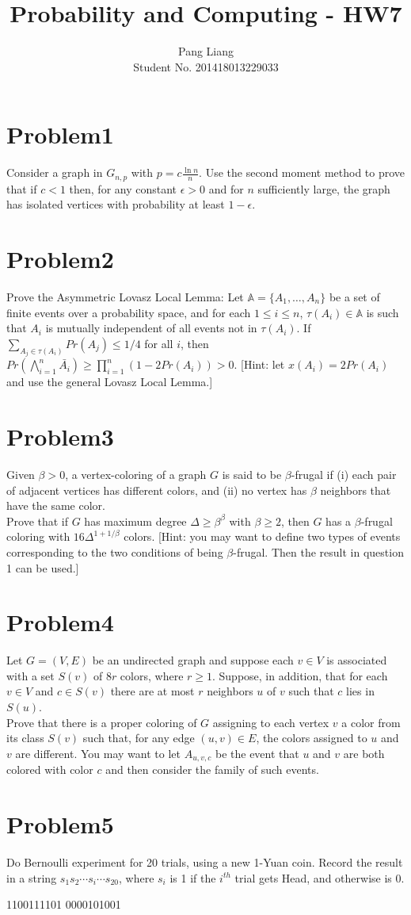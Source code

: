 \documentclass[12pt]{article}
\title{Probability and Computing - HW7}
\author{Pang Liang\\ Student No. 201418013229033}
\begin{document}
\maketitle

\section{Problem1}
Consider a graph in $G_{n,p}$ with $p = c\frac{\ln{n}}{n}$. Use the second moment method to prove that if $c < 1$ then, for any constant $\epsilon > 0$ and for $n$ sufficiently large, the graph has isolated vertices with probability at least $1-\epsilon$.

\section{Problem2}
Prove the Asymmetric Lovasz Local Lemma: Let $\mathbb{A} = \{A_1, \dots, A_n\}$ be a set of finite events over a probability space, and for each $1 \le i \le n$, $\tau(A_i) \in \mathbb{A}$ is such that $A_i$ is mutually independent of all events not in $\tau(A_i)$. If $\sum_{A_j \in \tau(A_i)} Pr(A_j) \le 1/4 $ for all $i$, then $ Pr(\bigwedge_{i=1}^n \bar{A_i}) \ge \prod_{i=1}^n (1 - 2Pr(A_i))> 0$. [Hint: let $x(A_i) = 2Pr(A_i)$ and use the general Lovasz Local Lemma.]

\section{Problem3}
Given $\beta > 0$, a vertex-coloring of a graph $G$ is said to be $\beta$-frugal if (i) each pair of adjacent vertices has different colors, and (ii) no vertex has $\beta$ neighbors that have the same color.\\
Prove that if $G$ has maximum degree $\Delta \ge \beta^\beta$ with $\beta \ge 2$, then $G$ has a $\beta$-frugal coloring with $16\Delta^{1+1/\beta}$ colors. [Hint: you may want to define two types of events corresponding to the two conditions of being $\beta$-frugal. Then the result in question 1 can be used.]

\section{Problem4}
Let $G = (V,E)$ be an undirected graph and suppose each $v \in V$ is associated with a set $S(v)$ of $8r$ colors, where $r \ge 1$. Suppose, in addition, that for each $v \in V$ and $c \in S(v)$ there are at most $r$ neighbors $u$ of $v$ such that $c$ lies in $S(u)$. \\
Prove that there is a proper coloring of $G$ assigning to each vertex $v$ a color from its class $S(v)$ such that, for any edge $(u, v) \in E$, the colors assigned to $u$ and $v$ are different. You may want to let $A_{u,v,c}$ be the event that $u$ and $v$ are both colored with color $c$ and then consider the family of such events.

\section{Problem5}
Do Bernoulli experiment for 20 trials, using a new 1-Yuan coin. Record the result in a
string $s_1s_2 \cdots s_i \cdots s_{20}$, where $s_i$ is 1 if the $i^{th}$ trial gets Head, and otherwise is 0.

1100111101 0000101001
\end{document}
